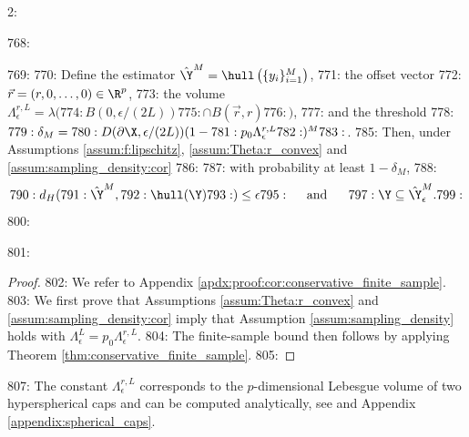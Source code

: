 2: \documentclass[12pt]{l4dc2022} %
\begin{document}
768: \begin{cor}%
769: \label{cor:conservative_finite_sample} 
770:  Define the estimator $\hat\Y^M=\hull\left(\{y_i\}_{i{=}1}^M\right)$, 
771:  the offset vector 
772:  $\vec{r}=(r,0,\dots,0)\in\R^p$, 
773:  the volume $\Lambda_{\epsilon}^{r,L}=\lambda\big(
774:  B(0,\epsilon/(2L)) 
775:  \cap B(\vec{r},r)
776:  \big)$, 
777:  and the threshold
778:  $
779:  \delta_M= 
780:  D(\partial\X,\epsilon/(2L))\smash{(1 -
781:  	p_0 \Lambda_{\epsilon}^{r,L}
782:  )^M}
783:  $.
785: Then, under Assumptions \ref{assum:f:lipschitz},  \ref{assum:Theta:r_convex} and \ref{assum:sampling_density:cor} 
786:   
787: with probability at least $ 1-\delta_M$,
788: $$
790: d_H(
791: \hat\Y^M, 
792: \hull(\Y)
793: )\leq \epsilon
795: \quad \text{ and }\quad\ 
797: \Y\subseteq\hat\Y_\epsilon^M.
799: $$
800: \end{cor}
801: \begin{proof}
802: We refer to Appendix \ref{apdx:proof:cor:conservative_finite_sample}.
803: We first prove that Assumptions \ref{assum:Theta:r_convex} and \ref{assum:sampling_density:cor} imply that Assumption \ref{assum:sampling_density} holds with $\Lambda_{\epsilon}^{L}=p_0\Lambda_{\epsilon}^{r,L}$. 
804: The finite-sample bound then follows by applying Theorem \ref{thm:conservative_finite_sample}. 
805: \end{proof}

807: The constant $\Lambda_{\epsilon}^{r,L}$ corresponds to the $p$-dimensional Lebesgue volume of two hyperspherical caps and can be computed analytically, see \citep{Li2011,Petitjean2013} and Appendix \ref{appendix:spherical_caps}.
\end{document}
